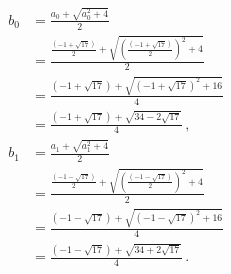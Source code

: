 \begin{align*}
b_0&=\frac{a_0+\sqrt{a_0^2+4}}{2}\\
&=\frac{
     \displaystyle\frac{(-1+\sqrt{17})}{2} + 
     \sqrt{\left(\displaystyle\frac{(-1+\sqrt{17})}{2}\right)^2+4}
   }{2}\\
&=\frac{
     (-1+\sqrt{17}) + 
     \sqrt{\left(-1+\sqrt{17}\right)^2+16}
   }{4}\\
&=\frac{
     (-1+\sqrt{17}) + 
     \sqrt{34-2\sqrt{17}}
   }{4}\,,\\
b_1&=\frac{a_1+\sqrt{a_1^2+4}}{2}\\
&=\frac{
     \displaystyle\frac{(-1-\sqrt{17})}{2} + 
     \sqrt{\left(\displaystyle\frac{(-1-\sqrt{17})}{2}\right)^2+4}
   }{2}\\
&=\frac{
     (-1-\sqrt{17}) + 
     \sqrt{\left(-1-\sqrt{17}\right)^2+16}
   }{4}\\
&=\frac{
     (-1-\sqrt{17}) + 
     \sqrt{34+2\sqrt{17}}
   }{4}\,.
\end{align*}

